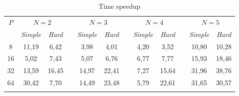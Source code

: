 \documentclass[runningheads]{llncs}
\begin{document}
\begin{table}
	\caption{Time speedup}
	\label{tab:2}
	\center
	\begin{tabular}{cccccccccccc}
		\hline\noalign{\smallskip}
		$P$ & \multicolumn{2}{c}{ $N=2$ } & & \multicolumn{2}{c}{$N=3$} & & \multicolumn{2}{c}{$N=4$} & & \multicolumn{2}{c}{$N=5$}  \\
		\noalign{\smallskip} \cline{2-3} \cline{5-6} \cline{8-9} \cline{11-12} \noalign{\smallskip}
		& \textit{Simple} & \textit{Hard} & & \textit{Simple} & \textit{Hard} & & \textit{Simple} & \textit{Hard} & & \textit{Simple} & \textit{Hard}  \\
		\noalign{\smallskip} \hline \noalign{\smallskip}
		8  & 11,19 & 6,42  & & 3,98  & 4,01  & & 4,20 & 3,52  & & 10,80 & 10,28 \\
		16 & 5,02  & 7,43  & & 5,07  & 6,76  & & 6,77 & 7,77  & & 15,93 & 18,46 \\
		32 & 13,59 & 16,45 & & 14,97 & 22,41 & & 7,27 & 15,64 & & 31,96 & 38,76 \\
		64 & 30,42 & 7,70  & & 14,49 & 23,48 & & 5,79 & 22,61 & & 31,65 & 30,57 \\
		\noalign{\smallskip}\hline
	\end{tabular}
\end{table}


\end{document}
